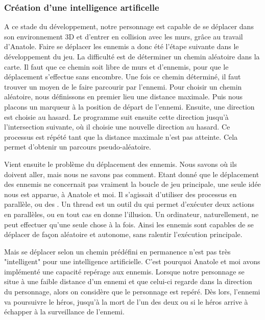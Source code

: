 \documentclass[12pt]{article}
\begin{document}
\newpage

\subsubsection{Création d'une intelligence artificelle}

A ce stade du développement, notre personnage est capable de se déplacer dans son environnement 3D et d'entrer en collision avec les murs, grâce au travail d'Anatole. Faire se déplacer les ennemis a donc été l'étape suivante dans le développement du jeu. La difficulté est de déterminer un chemin aléatoire dans la carte. Il faut que ce chemin soit libre de murs et d'ennemis, pour que le déplacement s'effectue sans encombre. Une fois ce chemin déterminé, il faut trouver un moyen de le faire parcourir par l'ennemi. Pour choisir un chemin aléatoire, nous définissons en premier lieu une distance maximale. Puis nous placons un marqueur à la position de départ de l'ennemi. Ensuite, une direction est choisie au hasard. Le programme suit ensuite cette direction jusqu'à l'intersection suivante, où il choisie une nouvelle direction au hasard. Ce processus est répété tant que la distance maximale n'est pas atteinte. Cela permet d'obtenir un parcours pseudo-aléatoire. 

Vient ensuite le problème du déplacement des ennemis. Nous savons où ils doivent aller, mais nous ne savons pas comment. Etant donné que le déplacement des ennemis ne concernait pas vraiment la boucle de jeu principale, une seule idée nous est apparue, à Anatole et moi. Il s'agissait d'utiliser des processus en parallèle, ou des . Un thread est un outil du  qui permet d'exécuter deux actions en parallèles, ou en tout cas en donne l'illusion. Un ordinateur, naturellement, ne peut effectuer qu'une seule chose à la fois. Ainsi les ennemis sont capables de se déplacer de façon aléatoire et autonome, sans ralentir l'exécution principale. 

Mais se déplacer selon un chemin prédéfini en permanence n'est pas très "intelligent" pour une intelligence artificielle. C'est pourquoi Anatole et moi avons implémenté une capacité repérage aux ennemis.  Lorsque notre personnage se situe à une faible distance d'un ennemi et que celui-ci regarde dans la direction du personnage, alors on considère que le personnage est repéré. Dès lors, l'ennemi va poursuivre le héros, jusqu'à la mort de l'un des deux ou si le héros arrive à échapper à la surveillance de l'ennemi. 
\end{document}
